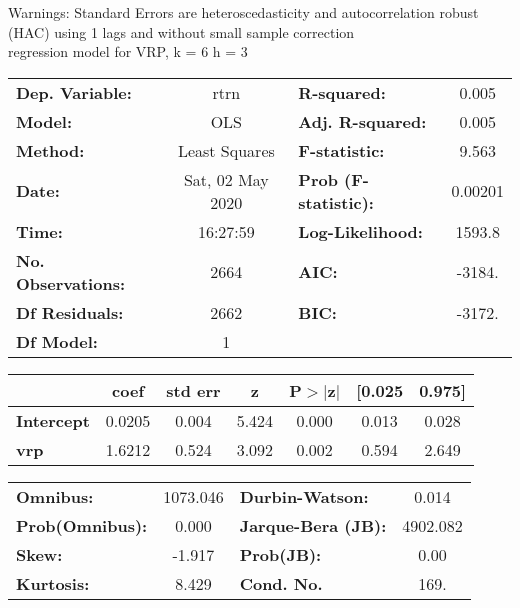 Warnings: \newline
 [1] Standard Errors are heteroscedasticity and autocorrelation robust (HAC) using 1 lags and without small sample correction\\ 

regression model for VRP, k = 6 h = 3\begin{center}
\begin{tabular}{lclc}
\toprule
\textbf{Dep. Variable:}    &       rtrn       & \textbf{  R-squared:         } &     0.005   \\
\textbf{Model:}            &       OLS        & \textbf{  Adj. R-squared:    } &     0.005   \\
\textbf{Method:}           &  Least Squares   & \textbf{  F-statistic:       } &     9.563   \\
\textbf{Date:}             & Sat, 02 May 2020 & \textbf{  Prob (F-statistic):} &  0.00201    \\
\textbf{Time:}             &     16:27:59     & \textbf{  Log-Likelihood:    } &    1593.8   \\
\textbf{No. Observations:} &        2664      & \textbf{  AIC:               } &    -3184.   \\
\textbf{Df Residuals:}     &        2662      & \textbf{  BIC:               } &    -3172.   \\
\textbf{Df Model:}         &           1      & \textbf{                     } &             \\
\bottomrule
\end{tabular}
\begin{tabular}{lcccccc}
                   & \textbf{coef} & \textbf{std err} & \textbf{z} & \textbf{P$> |$z$|$} & \textbf{[0.025} & \textbf{0.975]}  \\
\midrule
\textbf{Intercept} &       0.0205  &        0.004     &     5.424  &         0.000        &        0.013    &        0.028     \\
\textbf{vrp}       &       1.6212  &        0.524     &     3.092  &         0.002        &        0.594    &        2.649     \\
\bottomrule
\end{tabular}
\begin{tabular}{lclc}
\textbf{Omnibus:}       & 1073.046 & \textbf{  Durbin-Watson:     } &    0.014  \\
\textbf{Prob(Omnibus):} &   0.000  & \textbf{  Jarque-Bera (JB):  } & 4902.082  \\
\textbf{Skew:}          &  -1.917  & \textbf{  Prob(JB):          } &     0.00  \\
\textbf{Kurtosis:}      &   8.429  & \textbf{  Cond. No.          } &     169.  \\
\bottomrule
\end{tabular}
\end{center}

